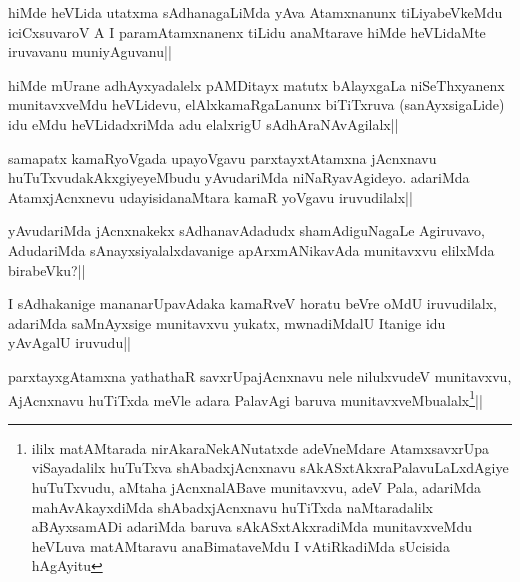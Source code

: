 
\begin{artha}
hiMde heVLida utatxma sAdhanagaLiMda yAva Atamxnanunx tiLiyabeVkeMdu iciCxsuvaroV A I paramAtamxnanenx tiLidu anaMtarave hiMde heVLidaMte iruvavanu muniyAguvanu||
\end{artha}


\begin{artha}
hiMde mUrane adhAyxyadalelx pAMDitayx matutx bAlayxgaLa niSeThxyanenx munitavxveMdu heVLidevu, elAlxkamaRgaLanunx biTiTxruva (sanAyxsigaLide) idu eMdu heVLidadxriMda adu elalxrigU sAdhAraNAvAgilalx||
\end{artha}


\begin{artha}
samapatx kamaRyoVgada upayoVgavu parxtayxtAtamxna jAcnxnavu huTuTxvudakAkxgiyeyeMbudu yAvudariMda niNaRyavAgideyo. adariMda AtamxjAcnxnevu udayisidanaMtara kamaR yoVgavu iruvudilalx||
\end{artha}

\begin{artha}
yAvudariMda jAcnxnakekx sAdhanavAdadudx shamAdiguNagaLe Agiruvavo, AdudariMda sAnayxsiyalalxdavanige apArxmANikavAda munitavxvu elilxMda birabeVku?||
\end{artha}

\begin{artha}
I sAdhakanige mananarUpavAdaka kamaRveV horatu beVre oMdU iruvudilalx, adariMda saMnAyxsige munitavxvu yukatx, mwnadiMdalU Itanige idu yAvAgalU iruvudu||
\end{artha}


\begin{artha}
parxtayxgAtamxna yathathaR savxrUpajAcnxnavu nele nilulxvudeV munitavxvu, AjAcnxnavu huTiTxda meVle adara PalavAgi baruva munitavxveMbualalx\footnote{ililx matAMtarada nirAkaraNekANutatxde adeVneMdare AtamxsavxrUpa viSayadalilx huTuTxva shAbadxjAcnxnavu sAkASxtAkxraPalavuLaLxdAgiye huTuTxvudu, aMtaha jAcnxnalABave munitavxvu, adeV Pala, adariMda mahAvAkayxdiMda shAbadxjAcnxnavu huTiTxda naMtaradalilx aBAyxsamADi adariMda baruva sAkASxtAkxradiMda munitavxveMdu heVLuva matAMtaravu anaBimataveMdu I vAtiRkadiMda sUcisida hAgAyitu}||
\end{artha}

